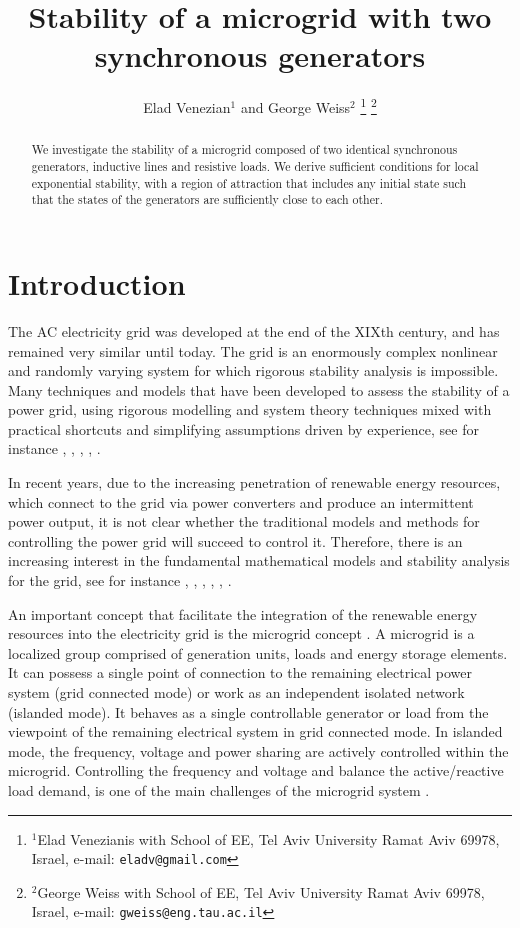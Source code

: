 \documentclass[letterpaper,10pt,conference]{ieeeconf}
\title{\LARGE \bf
Stability of a microgrid with two synchronous generators}
\author{Elad Venezian$^{1}$ and George Weiss$^{2}$%
\thanks{$^{1}$Elad Venezianis with School of EE,
        Tel Aviv University Ramat Aviv 69978, Israel,
        e-mail: {\tt\small eladv@gmail.com}}%
\thanks{$^{2}$George Weiss with School of EE,
        Tel Aviv University Ramat Aviv 69978, Israel,
        e-mail: {\tt\small gweiss@eng.tau.ac.il}}}
\begin{document}
\maketitle
\thispagestyle{empty}
\pagestyle{empty}

\begin{abstract}
We investigate the stability of a microgrid composed of two identical
synchronous generators, inductive lines and resistive loads. We 
derive sufficient conditions for local exponential stability, with 
a region of attraction that includes any initial state such that the 
states of the generators are sufficiently close to each other. 
\end{abstract}

\section{Introduction}

The AC electricity grid was developed at the end of the XIXth century,
and has remained very similar until today. The grid is an enormously
complex nonlinear and randomly varying system for which rigorous
stability analysis is impossible. Many techniques and models that have
been developed to assess the stability of a power grid, using rigorous
modelling and system theory techniques mixed with practical shortcuts
and simplifying assumptions driven by experience, see for instance
\cite{Kundur}, \cite{GrSt2014}, \cite{SauerPai1998}, \cite{GOBS:03},
\cite{DoBull:12}.

In recent years, due to the increasing penetration of renewable energy
resources, which connect to the grid via power converters and produce
an intermittent power output, it is not clear whether the traditional
models and methods for controlling the power grid will succeed to
control it. Therefore, there is an increasing interest in the
fundamental mathematical models and stability analysis for the grid,
see for instance \cite{DoBull:12}, \cite{PoDoBu:13}, \cite{CaTa:14},
\cite{NaWe:14}, \cite{NaWe:15}, \cite{DePersiSchaft:16}.

An important concept that facilitate the integration of the renewable
energy resources into the electricity grid is the microgrid concept
\cite{GreenProdanovic:07,Schiffer_2016_survey}. A microgrid is a
localized group comprised of generation units, loads and energy
storage elements. It can possess a single point of connection to the
remaining electrical power system (grid connected mode) or work as an
independent isolated network (islanded mode). It behaves as a single
controllable generator or load from the viewpoint of the remaining
electrical system in grid connected mode. In islanded mode, the
frequency, voltage and power sharing are actively controlled within
the microgrid. Controlling the frequency and voltage and balance the
active/reactive load demand, is one of the main challenges of the
microgrid system \cite{Shafiee_2016,Zhong:13}.
\end{document}
